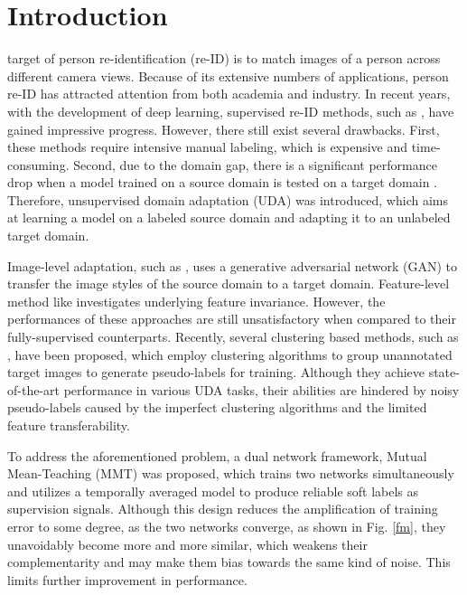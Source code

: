 \documentclass[journal]{IEEEtran}
\begin{document}
\section{Introduction}
 target of person re-identification (re-ID) is to match images of a person across different camera views. Because of its extensive numbers of applications, person re-ID has attracted attention from both academia and industry. In recent years, with the development of deep learning, supervised re-ID methods, such  as \cite{sun2018beyond, wang2018learning, quan2019auto, chen2019abd, luo2019strong, zhou2019omni, zheng2019joint, chen2019self}, have gained impressive progress. However, there still exist several drawbacks. First, these methods require intensive manual labeling, which is expensive and time-consuming. Second, due to the domain gap, there is a significant performance drop when a model trained on a source domain is tested on a target domain \cite{deng2018image,fan2018unsupervised}. Therefore, unsupervised domain adaptation (UDA) was introduced, which aims at learning a model on a labeled source domain and adapting it to an unlabeled target domain.\par 
Image-level adaptation, such as \cite{deng2018image,wei2018person}, uses a generative adversarial network (GAN) \cite{goodfellow2014generative} to transfer the image styles of the source domain to a target domain. Feature-level method like \cite{zhong2019invariance} investigates underlying feature invariance. However, the performances of these approaches are still unsatisfactory when compared to their fully-supervised counterparts. Recently, several clustering based methods, such as \cite{song2020unsupervised, zhang2019self, fu2019self, kumar2020unsupervised}, have been proposed, which employ clustering algorithms to group unannotated target images to generate pseudo-labels for training. Although they achieve state-of-the-art performance in various UDA tasks, their abilities are hindered by noisy pseudo-labels caused by the imperfect clustering algorithms and the limited feature transferability.\par 
To address the aforementioned problem, a dual network framework, Mutual Mean-Teaching (MMT) \cite{ge2020mutual} was proposed, which trains two networks simultaneously and utilizes a temporally averaged model to produce reliable soft labels as supervision signals. Although this design reduces the amplification of training error to some degree, as the two networks converge, as shown in Fig. \ref{fm}, they unavoidably become more and more similar, which weakens their complementarity and may make them bias towards the same kind of noise. This limits further improvement in performance.\par 
\end{document}
